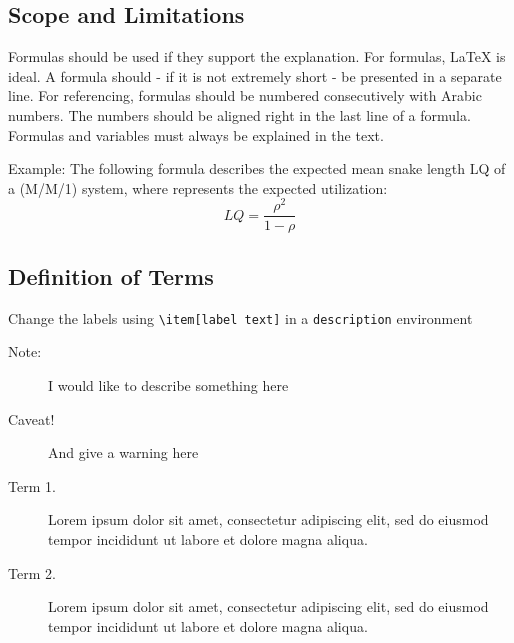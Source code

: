\subsection{Scope and Limitations}

Formulas should be used if they support the explanation. For formulas, LaTeX is ideal.
A formula should - if it is not extremely short - be presented in a separate line. For referencing, formulas should be numbered consecutively with Arabic numbers. The numbers should be aligned right in the last line of a formula. Formulas and variables must always be explained in the text.

Example: The following formula describes the expected mean snake length LQ of a (M/M/1) system, where represents the expected utilization:
\begin{equation}
       LQ=  \frac{\rho^2}{1-\rho} 
\end{equation}


\subsection{Definition of Terms}

\noindent Change the labels using \verb|\item[label text]| in a \texttt{description} environment
\begin{description}
     \item[Note:] I would like to describe something here
     \item[Caveat!] And give a warning here
     \item[Term 1.] Lorem ipsum dolor sit amet, consectetur adipiscing elit, sed do eiusmod tempor incididunt ut labore et dolore magna aliqua.
     \item[Term 2.] Lorem ipsum dolor sit amet, consectetur adipiscing elit, sed do eiusmod tempor incididunt ut labore et dolore magna aliqua.
\end{description}